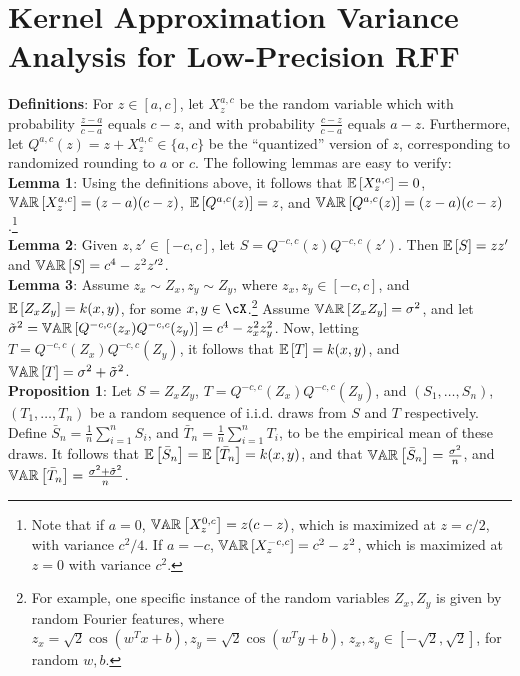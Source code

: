 \documentclass[12pt]{article}
\newcommand{\bS}{\bar{S}}
\newcommand{\bT}{\bar{T}}
\newcommand{\sq}{\sqrt{2}}
\newcommand{\eps}{\epsilon}
\newcommand{\tsigma}{\tilde{\sigma}}
\begin{document}
\section{Kernel Approximation Variance Analysis for Low-Precision RFF}
\noindent\textbf{Definitions}: For $z \in [a,c]$, let $X_z^{a,c}$ be the random variable which with probability $\frac{z-a}{c-a}$ equals $c-z$, and with probability $\frac{c-z}{c-a}$ equals $a-z$. Furthermore, let $Q^{a,c}(z) = z + X_z^{a,c} \in \{a,c\}$ be the ``quantized'' version of $z$, corresponding to randomized rounding to $a$ or $c$.  The following lemmas are easy to verify:\\

\noindent\textbf{Lemma 1}: Using the definitions above, it follows that $\expect{}{X_z^{a,c}} = 0$, $\var{}{X_z^{a,c}} = (z-a)(c-z)$, $\expect{}{Q^{a,c}(z)} = z$, and $\var{}{Q^{a,c}(z)} = (z-a)(c-z)$.\footnote{Note that if $a=0$, $\var{}{X_z^{0,c}} = z(c-z)$, which is maximized at $z=c/2$, with variance $c^2/4$.  If $a=-c$, $\var{}{X_z^{-c,c}} = c^2-z^2$, which is maximized at $z=0$ with variance $c^2$.}\\

\noindent\textbf{Lemma 2}: Given $z,z' \in [-c,c]$, let $S = Q^{-c,c}(z)Q^{-c,c}(z')$.
Then $\expect{}{S} = zz'$ and $\var{}{S} = c^4-z^2z'^{2}$.\\

\noindent \textbf{Lemma 3}:
Assume $z_x\sim Z_x, z_y\sim Z_y$, where
$z_x,z_y\in[-c,c]$, and $\expect{}{Z_xZ_y} = k(x,y)$, for some $x,y\in\cX$.\footnote{For example, one specific instance of the random variables $Z_x,Z_y$ is given by random Fourier features, where $z_x = \sq\cos(w^Tx+b),z_y = \sq\cos(w^Ty+b)$, $z_x,z_y\in[-\sq,\sq]$, for random $w,b$.}  Assume $\var{}{Z_xZ_y} = \sigma^2$, and let $\tsigma^2 = \var{}{Q^{-c,c}(z_x)Q^{-c,c}(z_y)} = c^4 - z_x^2z_y^2$.
Now, letting $T = Q^{-c,c}(Z_x)Q^{-c,c}(Z_y)$, it follows that $\expect{}{T} = k(x,y)$, and $\var{}{T} = \sigma^2 + \tsigma^2$. \\

\noindent\textbf{Proposition 1}: Let $S=Z_x Z_y$, $T = Q^{-c,c}(Z_x)Q^{-c,c}(Z_y)$, and $(S_1,\ldots,S_n)$, $(T_1,\ldots,T_n)$ be a random sequence of i.i.d. draws from $S$ and $T$ respectively.  Define $\bar{S}_n = \frac{1}{n}\sum_{i=1}^n S_i$, and $\bar{T}_n =  \frac{1}{n}\sum_{i=1}^n T_i$, to be the empirical mean of these draws.  It follows that $\expect{}{\bS_n} = \expect{}{\bT_n} = k(x,y)$, and that
$\var{}{\bS_n} = \frac{\sigma^2}{n}$, and $\var{}{\bT_n} = \frac{\sigma^2 + \tsigma^2}{n}$.\\
\end{document}
